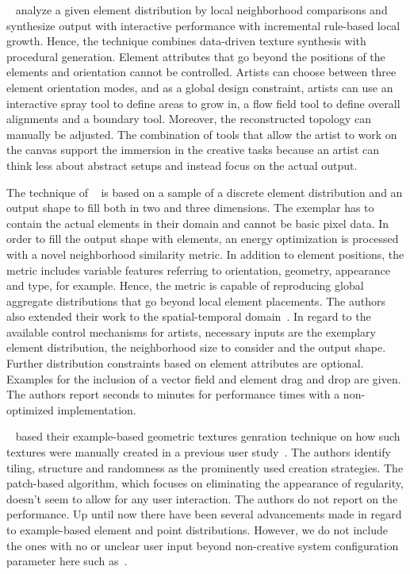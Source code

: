 \citeauthor*{ijiri_2008_aeb}~\cite{ijiri_2008_aeb} analyze a given element distribution by local neighborhood comparisons and synthesize output with interactive performance with incremental rule-based local growth. Hence, the technique combines data-driven texture synthesis with procedural generation. Element attributes that go beyond the positions of the elements and orientation cannot be controlled. Artists can choose between three element orientation modes, and as a global design constraint, artists can use an interactive spray tool to define areas to grow in, a flow field tool to define overall alignments and a boundary tool. Moreover, the reconstructed topology can manually be adjusted. The combination of tools that allow the artist to work on the canvas support the immersion in the creative tasks because an artist can think less about abstract setups and instead focus on the actual output.

The technique of \citeauthor*{ma_2011_det}~\cite{ma_2011_det} is based on a sample of a discrete element distribution and an output shape to fill both in two and three dimensions. The exemplar has to contain the actual elements in their domain and cannot be basic pixel data. In order to fill the output shape with elements, an energy optimization is processed with a novel neighborhood similarity metric. In addition to element positions, the metric includes  variable features referring to orientation, geometry, appearance and type, for example. Hence, the metric is capable of reproducing global aggregate distributions that go beyond local element placements. The authors also extended their work to the spatial-temporal domain~\cite{ma_2013_det}. In regard to the available control mechanisms for artists, necessary inputs are the exemplary element distribution, the neighborhood size to consider and the output shape. Further distribution constraints based on element attributes are optional. Examples for the inclusion of a vector field and element drag and drop are given. The authors report seconds to minutes for performance times with a non-optimized implementation.

\citeauthor*{almeraj_2013_pgt}~\cite{almeraj_2013_pgt} based their example-based geometric textures genration technique  on how such textures were manually created in a previous user study~\cite{almeraj_2011_tgt}. The authors identify tiling, structure and randomness as the prominently used creation strategies. The patch-based algorithm, which focuses on eliminating the appearance of regularity, doesn't seem to allow for any user interaction. The authors do not report on the performance. Up until now there have been several advancements made in regard to example-based element and point distributions. However, we do not include the ones with no or unclear user input beyond non-creative system configuration parameter here such as~\cite{peihan_2019_pps, chen_2019_mpc}.



